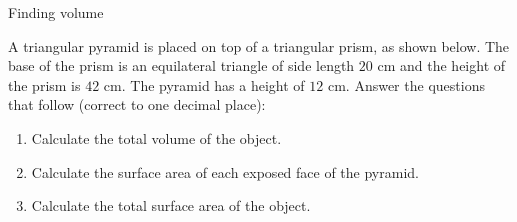 \begin{wex}{Finding volume}
 {A triangular pyramid is placed on top of a triangular prism, as shown below. 
The base of the prism is an equilateral triangle of side length $20$ cm and the height of the prism is $42$ cm. The pyramid has a height of $12$ cm. Answer the questions that follow (correct to one decimal place):

\begin{enumerate}[noitemsep, label=\textbf{\arabic*}. ] 
\item Calculate the total volume of the object.
\item Calculate the surface area of each exposed face of the pyramid.
\item Calculate the total surface area of the object.
\end{enumerate}

\begin{center}


\end{center}}
\end{wex}
